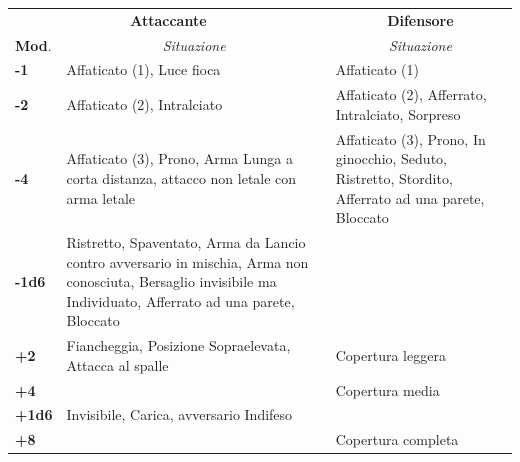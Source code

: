 \noindent\begin{tabularx}{0.98\textwidth}{l|X|X}
\multicolumn{2}{c}{\textbf{Attaccante}}&\multicolumn{1}{c}{\textbf{Difensore}}\\
\textbf{Mod}.&\multicolumn{1}{c}{\emph{Situazione}}&\multicolumn{1}{c}{\emph{Situazione}}\\
\toprule
\textbf{-1}& Affaticato (1), Luce fioca&Affaticato (1)\\
\hline
\textbf{-2}& Affaticato (2), Intralciato & Affaticato (2), Afferrato, Intralciato, Sorpreso\\
\hline
\textbf{-4}& Affaticato (3), Prono, Arma Lunga a corta distanza, attacco non letale con arma letale& Affaticato (3), Prono, In ginocchio, Seduto, Ristretto, Stordito, Afferrato ad una parete, Bloccato\\
\hline
\textbf{-1d6}& Ristretto, Spaventato, Arma da Lancio contro avversario in mischia, Arma non conosciuta, Bersaglio invisibile ma Individuato, Afferrato ad una parete, Bloccato&\\
\hline
\textbf{+2}& Fiancheggia, Posizione Sopraelevata, Attacca al spalle& Copertura leggera\\
\hline
\textbf{+4}&& Copertura media\\
\hline
\textbf{+1d6}& Invisibile, Carica, avversario Indifeso& \\
\hline
\textbf{+8}&& Copertura completa
\end{tabularx}

\medskip

